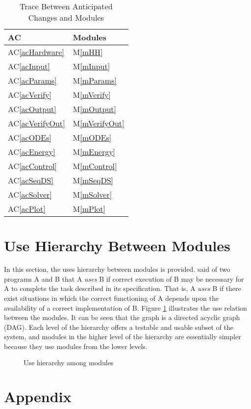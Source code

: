 \documentclass[12pt, titlepage]{article}
\newcommand{\acref}[1]{AC\ref{#1}}
\newcommand{\mref}[1]{M\ref{#1}}
\begin{document}
\begin{table}[H]
	\centering
	\begin{tabular}{p{} p{}}
		\toprule
		\textbf{AC}         & \textbf{Modules}  \\
		\midrule
		\acref{acHardware}  & \mref{mHH}        \\
		\acref{acInput}     & \mref{mInput}     \\
		\acref{acParams}    & \mref{mParams}    \\
		\acref{acVerify}    & \mref{mVerify}    \\
		\acref{acOutput}    & \mref{mOutput}    \\
		\acref{acVerifyOut} & \mref{mVerifyOut} \\
		\acref{acODEs}      & \mref{mODEs}      \\
		\acref{acEnergy}    & \mref{mEnergy}    \\
		\acref{acControl}   & \mref{mControl}   \\
		\acref{acSeqDS}     & \mref{mSeqDS}     \\
		\acref{acSolver}    & \mref{mSolver}    \\
		\acref{acPlot}      & \mref{mPlot}      \\
		\bottomrule
	\end{tabular}
	\caption{Trace Between Anticipated Changes and Modules}
	\label{TblACT}
\end{table}

\section{Use Hierarchy Between Modules} \label{SecUse}

In this section, the uses hierarchy between modules is provided. \citet{Parnas1978} said of two
programs A and B that A {\em uses} B if correct execution of B may be necessary for A to complete
the task described in its specification. That is, A {\em uses} B if there exist situations in which
the correct functioning of A depends upon the availability of a correct implementation of B. Figure
\ref{FigUH} illustrates the use relation between the modules. It can be seen that the graph is a
directed acyclic graph (DAG). Each level of the hierarchy offers a testable and usable subset of
the system, and modules in the higher level of the hierarchy are essentially simpler because they
use modules from the lower levels.

\begin{figure}[H]
	\centering
	\caption{Use hierarchy among modules}
	\label{FigUH}
\end{figure}

\newpage




\newpage

\section{Appendix}

\end{document}
